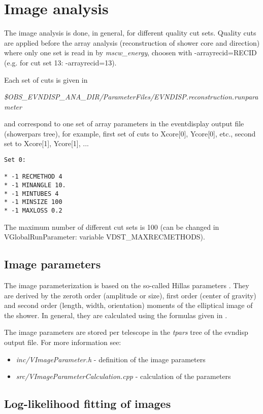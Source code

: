 \documentclass[titlepage,a4paper,twoside,11pt]{report}
\begin{document}
\section{Image analysis}

The image analysis is done, in general, for different quality cut sets. Quality cuts are applied before the array analysis (reconstruction of shower core and direction) where only one set is read in by {\it mscw\_energy}, choosen with -arrayrecid=RECID (e.g. for cut set 13: -arrayrecid=13).

Each set of cuts is given in 

{\it \$OBS\_EVNDISP\_ANA\_DIR/ParameterFiles/EVNDISP.reconstruction.runparameter} 

and correspond to one set of array parameters in the eventdisplay output file (showerpars tree), for example, first set of cuts to Xcore[0], Ycore[0], etc., second set to Xcore[1], Ycore[1], ...

\begin{lstlisting}
Set 0:

* -1 RECMETHOD 4
* -1 MINANGLE 10.
* -1 MINTUBES 4
* -1 MINSIZE 100
* -1 MAXLOSS 0.2

\end{lstlisting}

The maximum number of different cut sets is 100 (can be changed in VGlobalRunParameter: variable VDST\_MAXRECMETHODS).

\subsection{Image parameters}
The image parameterization is based on the so-called Hillas parameters \cite{1985ICRC....3..445H}. They are derived by the zeroth order (amplitude or size), first order (center of gravity) and second order (length, width, orientation) moments of the elliptical image of the shower. In general, they are calculated using the formulas given in \cite{1997JPhG...23.1013F}.

The image parameters are stored per telescope in the {\it tpars} tree of the evndisp output file. For more information see: 
\begin{itemize}
\item {\it inc/VImageParameter.h} - definition of the image parameters
\item {\it src/VImageParameterCalculation.cpp} - calculation of the parameters 
\end{itemize}

\subsection{Log-likelihood fitting of images}
\end{document}
